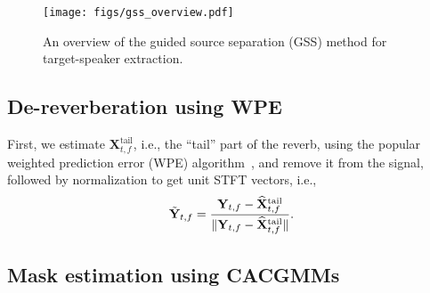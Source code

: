 \documentclass[a4paper]{article}
\begin{document}
\begin{figure}[t]
    \centering
    \texttt{[image: figs/gss\_overview.pdf]}
    \vspace{-0.8em}
    \caption{An overview of the guided source separation (GSS) method for target-speaker extraction.}
    \label{fig:gss}
\end{figure}

\subsection{De-reverberation using WPE}
\label{sec:wpe}

First, we estimate $\mathbf{X}_{t,f}^{\mathrm{tail}}$, i.e., the ``tail'' part of the reverb, using the popular weighted prediction error (WPE) algorithm~\cite{Nakatani2008BlindSD,Nakatani2010SpeechDB}, and remove it from the signal, followed by normalization to get unit STFT vectors, i.e.,
\begin{equation}
    \Tilde{\mathbf{Y}}_{t,f} = \frac{\mathbf{Y}_{t,f}-\widehat{\mathbf{X}}_{t,f}^{\mathrm{tail}}}{\Vert\mathbf{Y}_{t,f}-\widehat{\mathbf{X}}_{t,f}^{\mathrm{tail}}\Vert}.
\end{equation}

\subsection{Mask estimation using CACGMMs}
\label{sec:mask}
\end{document}
